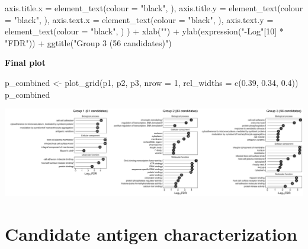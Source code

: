 \documentclass[
  11pt,
  oneside]{book}
\newenvironment{Shaded}{\begin{snugshade}}{\end{snugshade}}
\newcommand{\AttributeTok}[1]{\textcolor[rgb]{0.77,0.63,0.00}{#1}}
\newcommand{\DecValTok}[1]{\textcolor[rgb]{0.00,0.00,0.81}{#1}}
\newcommand{\FloatTok}[1]{\textcolor[rgb]{0.00,0.00,0.81}{#1}}
\newcommand{\FunctionTok}[1]{\textcolor[rgb]{0.00,0.00,0.00}{#1}}
\newcommand{\NormalTok}[1]{#1}
\newcommand{\OtherTok}[1]{\textcolor[rgb]{0.56,0.35,0.01}{#1}}
\newcommand{\SpecialCharTok}[1]{\textcolor[rgb]{0.00,0.00,0.00}{#1}}
\newcommand{\StringTok}[1]{\textcolor[rgb]{0.31,0.60,0.02}{#1}}
\begin{document}
\begin{Shaded}
\begin{Highlighting}[]
    \AttributeTok{axis.title.x =} \FunctionTok{element\_text}\NormalTok{(}\AttributeTok{colour =} \StringTok{"black"}\NormalTok{, ),}
    \AttributeTok{axis.title.y =} \FunctionTok{element\_text}\NormalTok{(}\AttributeTok{colour =} \StringTok{"black"}\NormalTok{, ),}
    \AttributeTok{axis.text.x =} \FunctionTok{element\_text}\NormalTok{(}\AttributeTok{colour =} \StringTok{"black"}\NormalTok{, ),}
    \AttributeTok{axis.text.y =} \FunctionTok{element\_text}\NormalTok{(}\AttributeTok{colour =} \StringTok{"black"}\NormalTok{, )}
\NormalTok{  ) }\SpecialCharTok{+}
  \FunctionTok{xlab}\NormalTok{(}\StringTok{""}\NormalTok{) }\SpecialCharTok{+}
  \FunctionTok{ylab}\NormalTok{(}\FunctionTok{expression}\NormalTok{(}\StringTok{"{-}Log"}\NormalTok{[}\DecValTok{10}\NormalTok{] }\SpecialCharTok{*} \StringTok{"FDR"}\NormalTok{)) }\SpecialCharTok{+}
  \FunctionTok{ggtitle}\NormalTok{(}\StringTok{"Group 3 (56 candidates)"}\NormalTok{)}
\end{Highlighting}
\end{Shaded}

\textbf{Final plot}

\begin{Shaded}
\begin{Highlighting}[]
\NormalTok{p\_combined }\OtherTok{\textless{}{-}} \FunctionTok{plot\_grid}\NormalTok{(p1, p2, p3, }\AttributeTok{nrow =} \DecValTok{1}\NormalTok{, }\AttributeTok{rel\_widths =} \FunctionTok{c}\NormalTok{(}\FloatTok{0.39}\NormalTok{, }\FloatTok{0.34}\NormalTok{, }\FloatTok{0.4}\NormalTok{))}
\NormalTok{p\_combined}
\end{Highlighting}
\end{Shaded}

\begin{center}\includegraphics[width=1\linewidth]{./figures/Fig 5} \end{center}

\hypertarget{candidate-antigen-characterization}{%
\section{Candidate antigen characterization}\label{candidate-antigen-characterization}}
\end{document}
